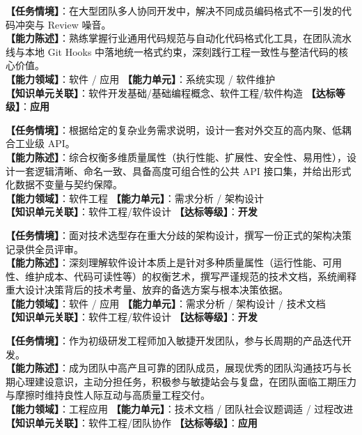 \begin{taskbox}[任务 7：自动化代码工程格式化与规范统一约束]
\textbf{【任务情境】}：在大型团队多人协同开发中，解决不同成员编码格式不一引发的代码冲突与 Review 噪音。\\
\textbf{【能力陈述】}：熟练掌握行业通用代码规范与自动化代码格式化工具，在团队流水线与本地 Git Hooks 中落地统一格式约束，深刻践行工程一致性与整洁代码的核心价值。\\
\textbf{【能力领域】}：软件 / 应用 \quad \textbf{【能力单元】}：系统实现 / 软件维护\\
\textbf{【知识单元关联】}：软件开发基础/基础编程概念、软件工程/软件构造 \quad \textbf{【达标等级】}：\textbf{应用}
\end{taskbox}

\begin{taskbox}
\textbf{【任务情境】}：根据给定的复杂业务需求说明，设计一套对外交互的高内聚、低耦合工业级 API。\\
\textbf{【能力陈述】}：综合权衡多维质量属性（执行性能、扩展性、安全性、易用性），设计一套逻辑清晰、命名一致、具备高度可组合性的公共 API 接口集，并给出形式化数据不变量与契约保障。\\
\textbf{【能力领域】}：软件工程 \quad \textbf{【能力单元】}：需求分析 / 架构设计\\
\textbf{【知识单元关联】}：软件工程/软件设计 \quad \textbf{【达标等级】}：\textbf{开发}
\end{taskbox}

\begin{taskbox}[任务 9：关键系统架构设计决策与权衡技术文档撰写]
\textbf{【任务情境】}：面对技术选型存在重大分歧的架构设计，撰写一份正式的架构决策记录供全员评审。\\
\textbf{【能力陈述】}：深刻理解软件设计本质上是针对多种质量属性（运行性能、可用性、维护成本、代码可读性等）的权衡艺术，撰写严谨规范的技术文档，系统阐释重大设计决策背后的技术考量、放弃的备选方案与根本决策依据。\\
\textbf{【能力领域】}：软件 / 应用 \quad \textbf{【能力单元】}：需求分析 / 架构设计 / 技术文档\\
\textbf{【知识单元关联】}：软件工程/软件设计 \quad \textbf{【达标等级】}：\textbf{开发}
\end{taskbox}

\begin{taskbox}[任务 10：作为高效成员参与敏捷团队协作与全周期协同]
\textbf{【任务情境】}：作为初级研发工程师加入敏捷开发团队，参与长周期的产品迭代开发。\\
\textbf{【能力陈述】}：成为团队中高产且可靠的团队成员，展现优秀的团队沟通技巧与长期心理建设意识，主动分担任务，积极参与敏捷站会与复盘，在团队面临工期压力与摩擦时维持良性人际互动与高质量工程交付。\\
\textbf{【能力领域】}：工程应用 \quad \textbf{【能力单元】}：技术文档 / 团队社会议题调适 / 过程改进\\
\textbf{【知识单元关联】}：软件工程/团队协作 \quad \textbf{【达标等级】}：\textbf{应用}
\end{taskbox}

